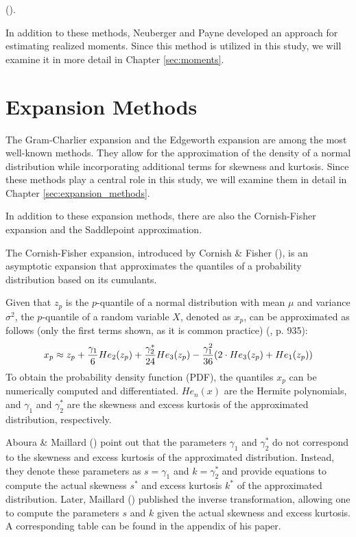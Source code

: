 (\citeyear{amayaDoesRealizedSkewness2015}). 

In addition to these methods, Neuberger and Payne developed an approach for estimating realized moments. Since this method is utilized in this study, we will examine it in more detail in Chapter \ref{sec:moments}.

\section{Expansion Methods}

The Gram-Charlier expansion and the Edgeworth expansion are among the most well-known methods. They allow for the approximation of the density of a normal distribution while incorporating additional terms for skewness and kurtosis. Since these methods play a central role in this study, we will examine them in detail in Chapter \ref{sec:expansion_methods}.

In addition to these expansion methods, there are also the Cornish-Fisher expansion and the Saddlepoint approximation.

The Cornish-Fisher expansion, introduced by Cornish \& Fisher (\citeyear{cornishMomentsCumulantsSpecification1938}), is an asymptotic expansion that approximates the quantiles of a probability distribution based on its cumulants.

Given that $z_p$ is the $p$-quantile of a normal distribution with mean $\mu$ and variance $\sigma^2$, the $p$-quantile of a random variable $X$, denoted as $x_p$, can be approximated as follows (only the first terms shown, as it is common practice) (\cite{abramowitzHandbookMathematicalFunctions1968}, p. 935):
\begin{align}
    x_p \approx z_p + \frac{\gamma_1}{6}He_2(z_p) + \frac{\gamma_2^*}{24}He_3(z_p) - \frac{\gamma_1^2}{36}(2\cdot He_3(z_p) + He_1(z_p)) \notag
\end{align}
To obtain the probability density function (PDF), the quantiles $x_p$ can be numerically computed and differentiated. $He_n(x)$ are the Hermite polynomials, and $\gamma_1$ and $\gamma_2^*$ are the skewness and excess kurtosis of the approximated distribution, respectively.

Aboura \& Maillard (\citeyear{abouraOptionPricingSkewness2016}) point out that the parameters $\gamma_1$ and $\gamma_2^*$ do not correspond to the skewness and excess kurtosis of the approximated distribution. Instead, they denote these parameters as $s = \gamma_1$ and $k = \gamma_2^*$ and provide equations to compute the actual skewness $s^*$ and excess kurtosis $k^*$ of the approximated distribution. Later, Maillard (\citeyear{maillardUserGuideCornish2018}) published the inverse transformation, allowing one to compute the parameters $s$ and $k$ given the actual skewness and excess kurtosis. A corresponding table can be found in the appendix of his paper.

